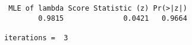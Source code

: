 \begin{verbatim} MLE of lambda Score Statistic (z) Pr(>|z|)
        0.9815              0.0421   0.9664

iterations =  3 
\end{verbatim}